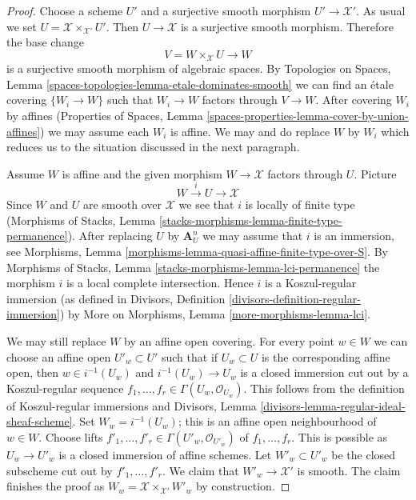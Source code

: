 \begin{proof}
Choose a scheme $U'$ and a surjective smooth morphism $U' \to \mathcal{X}'$.
As usual we set $U = \mathcal{X} \times_{\mathcal{X}'} U'$. Then
$U \to \mathcal{X}$ is a surjective smooth morphism. Therefore the base change
$$
V = W \times_{\mathcal{X}} U \longrightarrow W
$$
is a surjective smooth morphism of algebraic spaces.
By Topologies on Spaces, Lemma
\ref{spaces-topologies-lemma-etale-dominates-smooth}
we can find an \'etale covering $\{W_i \to W\}$ such
that $W_i \to W$ factors through $V \to W$.
After covering $W_i$ by affines (Properties of Spaces, Lemma
\ref{spaces-properties-lemma-cover-by-union-affines})
we may assume each $W_i$ is affine. We may and do replace $W$ by $W_i$
which reduces us to the situation discussed in the next paragraph.

\medskip\noindent
Assume $W$ is affine and the given morphism $W \to \mathcal{X}$ factors
through $U$. Picture
$$
W \xrightarrow{i} U \to \mathcal{X}
$$
Since $W$ and $U$ are smooth over $\mathcal{X}$ we see that
$i$ is locally of finite type (Morphisms of Stacks, Lemma
\ref{stacks-morphisms-lemma-finite-type-permanence}).
After replacing $U$ by $\mathbf{A}^n_U$ we may assume
that $i$ is an immersion, see
Morphisms, Lemma \ref{morphisms-lemma-quasi-affine-finite-type-over-S}.
By Morphisms of Stacks,
Lemma \ref{stacks-morphisms-lemma-lci-permanence}
the morphism $i$ is a local complete intersection.
Hence $i$ is a Koszul-regular immersion (as defined in
Divisors, Definition \ref{divisors-definition-regular-immersion})
by More on Morphisms, Lemma \ref{more-morphisms-lemma-lci}.

\medskip\noindent
We may still replace $W$ by an affine open covering.
For every point $w \in W$ we can choose an affine open
$U'_w \subset U'$ such that if $U_w \subset U$ is the
corresponding affine open, then $w \in i^{-1}(U_w)$ and
$i^{-1}(U_w) \to U_w$ is a closed immersion cut out
by a Koszul-regular sequence
$f_1, \ldots, f_r \in \Gamma(U_w, \mathcal{O}_{U_w})$.
This follows from the definition of Koszul-regular immersions
and Divisors, Lemma \ref{divisors-lemma-regular-ideal-sheaf-scheme}.
Set $W_w = i^{-1}(U_w)$; this is an affine open neighbourhood
of $w \in W$.
Choose lifts $f'_1, \ldots, f'_r \in \Gamma(U'_w, \mathcal{O}_{U'_w})$
of $f_1, \ldots, f_r$. This is possible as $U_w \to U'_w$
is a closed immersion of affine schemes.
Let $W'_w \subset U'_w$ be the closed subscheme cut out by
$f'_1, \ldots, f'_r$.
We claim that $W'_w \to \mathcal{X}'$ is smooth.
The claim finishes the proof as
$W_w = \mathcal{X} \times_{\mathcal{X}'} W'_w$
by construction.


\end{proof}
